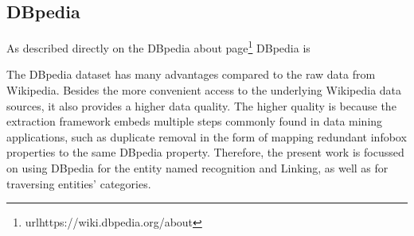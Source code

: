 



\subsection{\hspace*{3pt} DBpedia}

As described directly on the DBpedia about page\footnote{url{https://wiki.dbpedia.org/about}} DBpedia is 

\begin{displayquote}
\end{displayquote}


The DBpedia dataset has many advantages compared to the raw data from Wikipedia. Besides the more convenient access to the underlying Wikipedia data sources, it also provides a higher data quality. The higher quality is because the extraction framework embeds multiple steps commonly found in data mining applications, such as duplicate removal in the form of mapping redundant infobox properties to the same DBpedia property.
Therefore, the present work is focussed on using DBpedia for the entity named recognition and Linking, as well as for traversing entities' categories.


